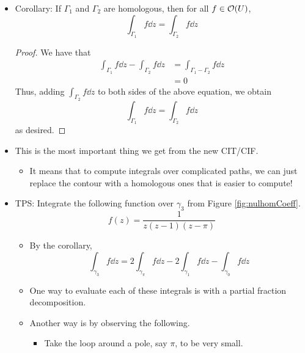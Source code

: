 \documentclass[../notes.tex]{subfiles}
\begin{document}
\begin{itemize}
\begin{itemize}
    \end{itemize}
    \item Corollary: If $\Gamma_1$ and $\Gamma_2$ are homologous, then for all $f\in\mathcal{O}(U)$,
    \begin{equation*}
        \int_{\Gamma_1}f\dd{z} = \int_{\Gamma_2}f\dd{z}
    \end{equation*}
    \begin{proof}
        We have that
        \begin{align*}
            \int_{\Gamma_1}f\dd{z}-\int_{\Gamma_2}f\dd{z} &= \int_{\Gamma_1-\Gamma_2}f\dd{z}\\
            &= 0\tag*{CIT}
        \end{align*}
        Thus, adding $\int_{\Gamma_2}f\dd{z}$ to both sides of the above equation, we obtain
        \begin{equation*}
            \int_{\Gamma_1}f\dd{z} = \int_{\Gamma_2}f\dd{z}
        \end{equation*}
        as desired.
    \end{proof}
    \item This is the most important thing we get from the new CIT/CIF.
    \begin{itemize}
        \item It means that to compute integrals over complicated paths, we can just replace the contour with a homologous ones that is easier to compute!
    \end{itemize}
    \item TPS: Integrate the following function over $\gamma_3$ from Figure \ref{fig:nulhomCoeff}.
    \begin{equation*}
        f(z) = \frac{1}{z(z-1)(z-\pi)}
    \end{equation*}
    \begin{itemize}
        \item By the corollary,
        \begin{equation*}
            \int_{\gamma_3}f\dd{z} = 2\int_{\gamma_\pi}f\dd{z}-2\int_{\gamma_1}f\dd{z}-\int_{\gamma_0}f\dd{z}
        \end{equation*}
        \item One way to evaluate each of these integrals is with a partial fraction decomposition.
        \item Another way is by observing the following.
        \begin{itemize}
            \item Take the loop around a pole, say $\pi$, to be very small.

\end{itemize}
\end{itemize}
\end{itemize}
\end{document}
